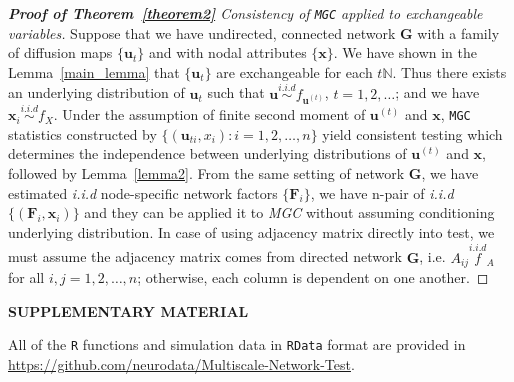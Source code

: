 \documentclass[12pt]{article}
\theoremstyle{definition}
\begin{document}
\begin{proof}[\textbf{Proof of Theorem~\ref{theorem2}} Consistency of \texttt{MGC} applied to exchangeable variables]

Suppose that we have undirected, connected network $\mathbf{G}$ with a family of diffusion maps $\{ \mathbf{u}_{t}  \}$ and with nodal attributes $\{ \mathbf{x}  \}$. We have shown in the Lemma~\ref{main_lemma} that $\{ \mathbf{u}_{t}  \}$ are exchangeable for each $t \mathbb{N}$. Thus there exists an underlying distribution of $\mathbf{u}_{t}$ such that $\mathbf{u} \overset{i.i.d}{\sim} f_{\mathbf{u}^{(t)}}$, $t= 1,2,\ldots $; and we have $\mathbf{x}_{i} \overset{i.i.d}{\sim} f_{X}$. Under the assumption of finite second moment of $\mathbf{u}^{(t)}$ and $\mathbf{x}$, \texttt{MGC} statistics constructed by $\{  (  \mathbf{u}_{ti}, x_{i} ) : i = 1,2,\ldots, n  \}$ yield consistent testing which determines the independence between underlying distributions of $\mathbf{u}^{(t)}$ and $\mathbf{x}$, followed by Lemma~\ref{lemma2}. 
From the same setting of network $\mathbf{G}$, we have estimated \textit{i.i.d} node-specific network factors $\{ \mathbf{F}_{i} \}$, we have n-pair of \textit{i.i.d} $\{ ( \mathbf{F}_{i}, \mathbf{x}_{i} )  \}$ and they can be applied it to \textit{MGC} without assuming conditioning underlying distribution. In case of using adjacency matrix directly into test, we must assume the adjacency matrix comes from directed network $\mathbf{G}$, i.e. $A_{ij} \overset{i.i.d} f_{A}$ for all $i,j=1,2,\ldots, n$; otherwise, each column is dependent on one another.  
\end{proof}





	
\newpage
\bigskip
\begin{center}
	{\large\bf SUPPLEMENTARY MATERIAL}
\end{center}
	
All of the \texttt{R} functions and simulation data in \texttt{RData} format are provided in \url{https://github.com/neurodata/Multiscale-Network-Test}.
	
	
\end{document}
